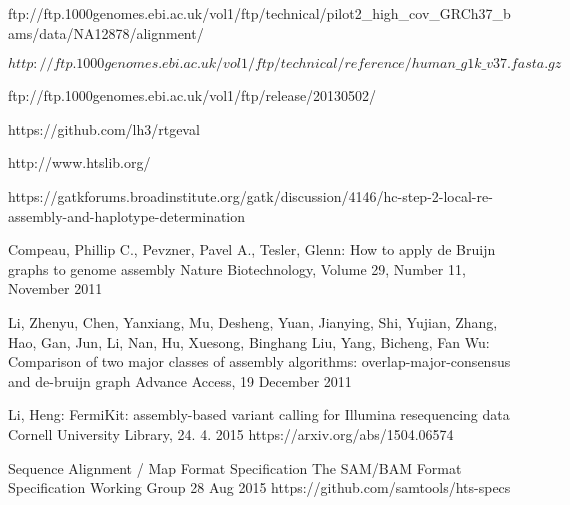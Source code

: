 


\renewcommand{\bibname}{References}

% 


\begin{thebibliography}{99}

 ftp://ftp.1000genomes.ebi.ac.uk/vol1/ftp/technical/pilot2\_high\_cov\_GRCh37\_bams/data/NA12878/alignment/

$http://ftp.1000genomes.ebi.ac.uk/vol1/ftp/technical/reference/human\_g1k\_v37.fasta.gz$

ftp://ftp.1000genomes.ebi.ac.uk/vol1/ftp/release/20130502/

https://github.com/lh3/rtgeval

http://www.htslib.org/

https://gatkforums.broadinstitute.org/gatk/discussion/4146/hc-step-2-local-re-assembly-and-haplotype-determination

Compeau, Phillip C., Pevzner, Pavel A., Tesler, Glenn:
How to apply de Bruijn graphs to genome assembly
Nature Biotechnology, Volume 29, Number 11, November 2011

Li, Zhenyu, Chen, Yanxiang, Mu, Desheng, Yuan, Jianying, Shi, Yujian, Zhang, Hao, Gan, Jun, Li, Nan, Hu, Xuesong, Binghang Liu, Yang, Bicheng, Fan Wu:
Comparison of two major classes of assembly algorithms: overlap-major-consensus and de-bruijn graph
Advance Access, 19 December 2011

Li, Heng: FermiKit: assembly-based variant calling for Illumina resequencing data
Cornell University Library, 24. 4. 2015
https://arxiv.org/abs/1504.06574

Sequence Alignment / Map Format Specification
The SAM/BAM Format Specification Working Group
28 Aug 2015
https://github.com/samtools/hts-specs


\end{thebibliography}
